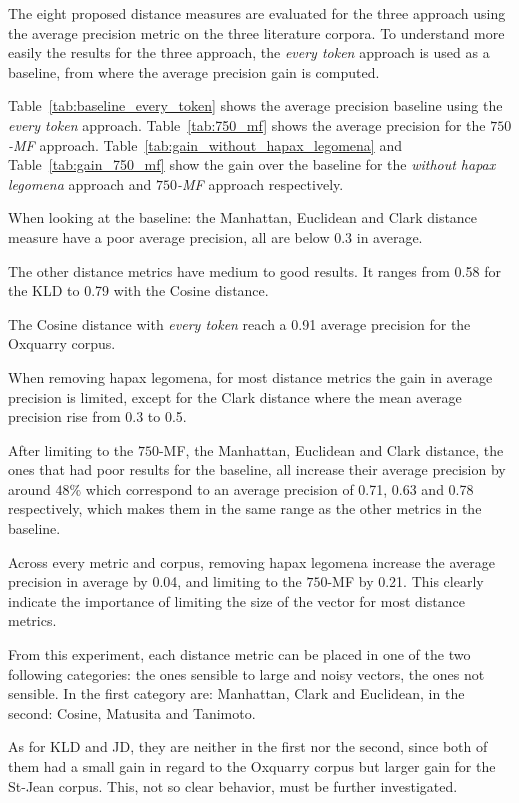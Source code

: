 The eight proposed distance measures are evaluated for the three approach using the average precision metric on the three literature corpora.
To understand more easily the results for the three approach, the \textit{every token} approach is used as a baseline, from where the average precision gain is computed.

Table~\ref{tab:baseline_every_token} shows the average precision baseline using the \textit{every token} approach.
Table~\ref{tab:750_mf} shows the average precision for the \textit{$750$-MF} approach.
Table~\ref{tab:gain_without_hapax_legomena} and Table~\ref{tab:gain_750_mf} show the gain over the baseline for the \textit{without hapax legomena} approach and \textit{$750$-MF} approach respectively.

When looking at the baseline: the Manhattan, Euclidean and Clark distance measure have a poor average precision, all are below 0.3 in average.

The other distance metrics have medium to good results.
It ranges from 0.58 for the KLD to 0.79 with the Cosine distance.

The Cosine distance with \textit{every token} reach a 0.91 average precision for the Oxquarry corpus.

When removing hapax legomena, for most distance metrics the gain in average precision is limited, except for the Clark distance where the mean average precision rise from 0.3 to 0.5.

After limiting to the $750$-MF, the Manhattan, Euclidean and Clark distance, the ones that had poor results for the baseline, all increase their average precision by around $48\%$ which correspond to an average precision of 0.71, 0.63 and 0.78 respectively, which makes them in the same range as the other metrics in the baseline.

Across every metric and corpus, removing hapax legomena increase the average precision in average by 0.04, and limiting to the $750$-MF by 0.21.
This clearly indicate the importance of limiting the size of the vector for most distance metrics.

From this experiment, each distance metric can be placed in one of the two following categories: the ones sensible to large and noisy vectors, the ones not sensible.
In the first category are: Manhattan, Clark and Euclidean, in the second: Cosine, Matusita and Tanimoto.

As for KLD and JD, they are neither in the first nor the second, since both of them had a small gain in regard to the Oxquarry corpus but larger gain for the St-Jean corpus.
This, not so clear behavior, must be further investigated.

